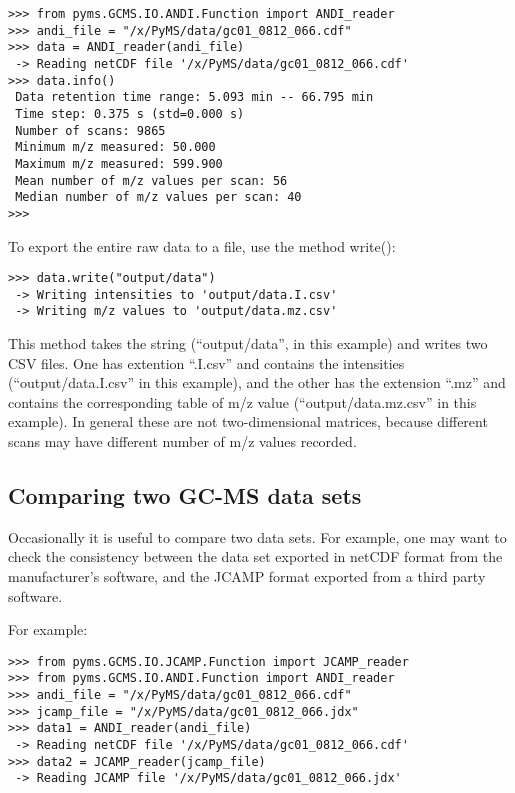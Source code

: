 \begin{verbatim}
>>> from pyms.GCMS.IO.ANDI.Function import ANDI_reader
>>> andi_file = "/x/PyMS/data/gc01_0812_066.cdf"
>>> data = ANDI_reader(andi_file)
 -> Reading netCDF file '/x/PyMS/data/gc01_0812_066.cdf'
>>> data.info()
 Data retention time range: 5.093 min -- 66.795 min
 Time step: 0.375 s (std=0.000 s)
 Number of scans: 9865
 Minimum m/z measured: 50.000
 Maximum m/z measured: 599.900
 Mean number of m/z values per scan: 56
 Median number of m/z values per scan: 40
>>>
\end{verbatim}

To export the entire raw data to a file, use the method write():

\begin{verbatim}
>>> data.write("output/data")
 -> Writing intensities to 'output/data.I.csv'
 -> Writing m/z values to 'output/data.mz.csv'
\end{verbatim}

This method takes the string (``output/data'', in this example)
and writes two CSV files. One has extention ``.I.csv'' and
contains the intensities (``output/data.I.csv'' in this example),
and the other has the extension ``.mz'' and contains the
corresponding table of m/z value (``output/data.mz.csv'' in
this example). In general these are not two-dimensional matrices,
because different scans may have different number of m/z
values recorded.

\subsection{Comparing two GC-MS data sets}


Occasionally it is useful to compare two data sets. For example,
one may want to check the consistency between the data set
exported in netCDF format from the manufacturer's software, and
the JCAMP format exported from a third party software.

For example:

\begin{verbatim}
>>> from pyms.GCMS.IO.JCAMP.Function import JCAMP_reader
>>> from pyms.GCMS.IO.ANDI.Function import ANDI_reader
>>> andi_file = "/x/PyMS/data/gc01_0812_066.cdf"
>>> jcamp_file = "/x/PyMS/data/gc01_0812_066.jdx"
>>> data1 = ANDI_reader(andi_file)
 -> Reading netCDF file '/x/PyMS/data/gc01_0812_066.cdf'
>>> data2 = JCAMP_reader(jcamp_file)
 -> Reading JCAMP file '/x/PyMS/data/gc01_0812_066.jdx'
\end{verbatim}

